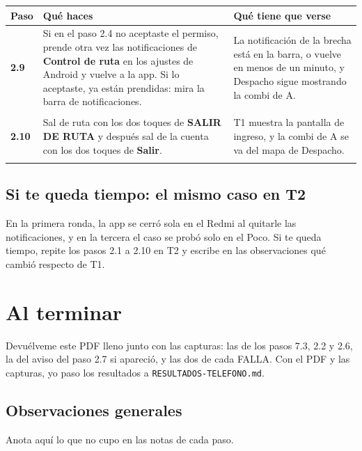 \documentclass[10pt,a4paper]{article}
\makeatletter
\newcommand{\toca}[1]{\textcolor{azul}{\textbf{#1}}}
\newcommand{\caja}[2]{\hbox{\vrule height #1 depth 0pt width 0pt #2}}
\newcommand{\campo}[3]{%
  \raisebox{-0.35\height}{\caja{#3}{\TextField[name=#1, width=#2, height=#3, charsize=8pt, bordercolor={0.55 0.6 0.68},
    backgroundcolor={0.965 0.976 0.992}, multiline=true]{}}}}
\newcommand{\resultado}[1]{%
  \caja{9pt}{\ChoiceMenu[radio, name=resultado-#1, width=9pt, height=9pt, radiosymbol=l,
    bordercolor={0.35 0.38 0.45}, default=]{}{OK=ok,FALLA=falla,NO SE PUDO=nopudo}}}
\newcommand{\paso}[4]{%
  \textbf{#1} & #3 & #4 \\*
  \multicolumn{3}{@{\hspace{6pt}}l@{}}{\rule{0pt}{15pt}\small
    \resultado{#2}\hspace{0.4em}Hora:~\campo{hora-#2}{1.7cm}{13pt}\hspace{1.2em}Nota:~\campo{nota-#2}{8.3cm}{22pt}}\\[3pt]
  \hline
}
\newenvironment{pasos}{%
  \begin{longtable}{@{\hspace{6pt}}>{\raggedright\arraybackslash}p{0.9cm}>{\raggedright\arraybackslash}p{7.9cm}>{\raggedright\arraybackslash}p{7.3cm}@{}}
  \rowcolor{cabecera}\textbf{Paso} & \textbf{Qué haces} & \textbf{Qué tiene que verse} \\ \hline
  \endhead
}{\end{longtable}\vspace{-0.6em}}
\makeatother
\begin{document}
\begin{Form}
\begin{pasos}
\paso{2.9}{2-9}{Si en el paso 2.4 no aceptaste el permiso, prende otra vez las notificaciones de \toca{Control de ruta} en los ajustes de Android y vuelve a la app. Si lo aceptaste, ya están prendidas: mira la barra de notificaciones.}{La notificación de la brecha está en la barra, o vuelve en menos de un minuto, y Despacho sigue mostrando la combi de A.}
\paso{2.10}{2-10}{Sal de ruta con los dos toques de \toca{SALIR DE RUTA} y después sal de la cuenta con los dos toques de \toca{Salir}.}{T1 muestra la pantalla de ingreso, y la combi de A se va del mapa de Despacho.}
\end{pasos}

\subsection{Si te queda tiempo: el mismo caso en T2}

En la primera ronda, la app se cerró sola en el Redmi al quitarle las notificaciones, y en la tercera el caso se probó solo en el Poco. Si te queda tiempo, repite los pasos 2.1 a 2.10 en T2 y escribe en las observaciones qué cambió respecto de T1.

\section{Al terminar}

Devuélveme este PDF lleno junto con las capturas: las de los pasos 7.3, 2.2 y 2.6, la del aviso del paso 2.7 si apareció, y las dos de cada FALLA. Con el PDF y las capturas, yo paso los resultados a \texttt{RESULTADOS-TELEFONO.md}.

\subsection{Observaciones generales}

Anota aquí lo que no cupo en las notas de cada paso.

\TextField[name=observaciones, width=\linewidth, height=6cm, charsize=9pt, multiline=true,
  bordercolor={0.55 0.6 0.68}, backgroundcolor={0.965 0.976 0.992}]{}

\end{Form}
\end{document}
